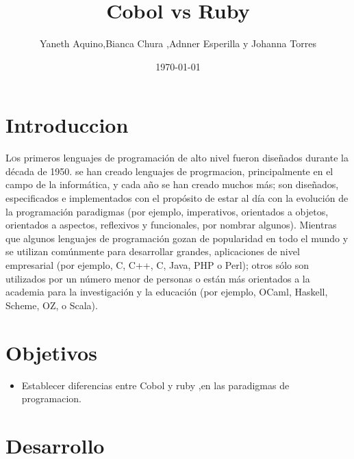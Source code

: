 \documentclass[twoside,twocolumn]{article}
\title{ Cobol vs Ruby} %
\author{Yaneth Aquino,Bianca Chura ,Adnner Esperilla y Johanna Torres}
\date{\today} %
\begin{document}
\maketitle


\section{Introduccion}

\lettrine[nindent=0em,lines=3]{L}os primeros lenguajes de programación de alto nivel fueron diseñados durante la década de 1950. 
se han creado lenguajes de progrmacion, principalmente en el campo de la informática, y cada año se han creado muchos más; son
diseñados, especificados e implementados con el propósito de estar al día con la evolución de la programación
paradigmas (por ejemplo, imperativos, orientados a objetos, orientados a aspectos, reflexivos y funcionales, por nombrar algunos).
Mientras que algunos lenguajes de programación gozan de popularidad en todo el mundo y se utilizan comúnmente para desarrollar grandes,
aplicaciones de nivel empresarial (por ejemplo, C, C++, C, Java, PHP o Perl); otros sólo son utilizados por un número menor de
personas o están más orientados a la academia para la investigación y la educación (por ejemplo, OCaml, Haskell, Scheme, OZ, o
Scala).
\section{Objetivos}
\begin{itemize}
\item Establecer diferencias entre Cobol y ruby ,en las paradigmas de programacion.
\end{itemize}
\section{Desarrollo}
\end{document}
